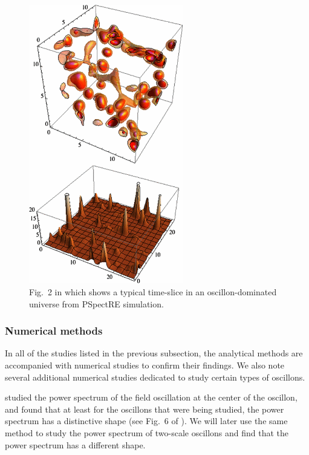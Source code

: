 \documentclass{report}
\begin{document}
\begin{figure}
  \centering
  \includegraphics[width=0.6\textwidth]{plot/oscillons-2.png}
  \caption{Fig.~2 in \cite{Amin:2011hj} which shows a typical time-slice in an oscillon-dominated universe from PSpectRE simulation.}\label{monodromyoscillons}
\end{figure}

\subsubsection{Numerical methods}
In all of the studies listed in the previous subsection, the analytical methods are accompanied with numerical studies to confirm their findings. We also note several additional numerical studies dedicated to study certain types of oscillons.

\cite{Salmi:2012ta} studied the power spectrum of the field oscillation at the center of the oscillon, and found that at least for the oscillons that were being studied, the power spectrum has a distinctive shape (see Fig.~6 of \cite{Hindmarsh:2006ur}). We will later use the same method to study the power spectrum of two-scale oscillons and find that the power spectrum has a different shape.
\end{document}

